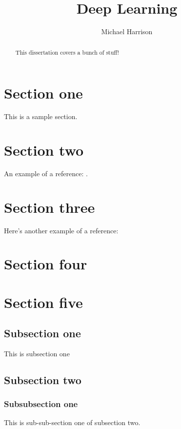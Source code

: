 \documentclass[11pt]{article} %
\title{Deep Learning}
\author{Michael Harrison}
\theoremstyle{plain}
\theoremstyle{definition}
\begin{document}
\maketitle

\declaration

\begin{abstract}
  This dissertation covers a bunch of stuff!
\end{abstract}

\listoffigures
\newpage

\section{Section one}

This is a sample section.

\section{Section two}

An example of a reference:
\cite{hastie/etal:2009}.

\section{Section three}

Here's another example of a reference:
\cite{MURA2017}

\newpage
\section{Section four}
\lipsum

\newpage
\section{Section five}
\subsection{Subsection one}
This is subsection one

\subsection{Subsection two}
\subsubsection{Subsubsection one}
This is sub-sub-section one of subsection two.
\end{document}
